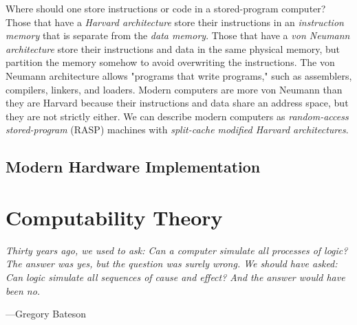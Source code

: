 Where should one store instructions or code in a stored-program computer? Those that have a \textit{Harvard architecture} store their instructions in an \textit{instruction memory} that is separate from the \textit{data memory}. Those that have a \textit{von Neumann architecture} store their instructions and data in the same physical memory, but partition the memory somehow to avoid overwriting the instructions. The von Neumann architecture allows "programs that write programs," such as assemblers, compilers, linkers, and loaders. Modern computers are more von Neumann than they are Harvard because their instructions and data share an address space, but they are not strictly either. We can describe modern computers as \textit{random-access stored-program} (RASP) machines with \textit{split-cache modified Harvard architectures}. \\


\subsection{Modern Hardware Implementation}


	

\toclineskip
\section{Computability Theory}

\vspace{4mm}
\begin{displayquote}
\textit{Thirty years ago, we used to ask: Can a computer simulate all processes of logic? The answer was yes, but the question was surely wrong. We should have asked: Can logic simulate all sequences of cause and effect? And the answer would have been no.}
\begin{flushright}
	---Gregory Bateson
\end{flushright}
\end{displayquote}
\vspace{4mm}

